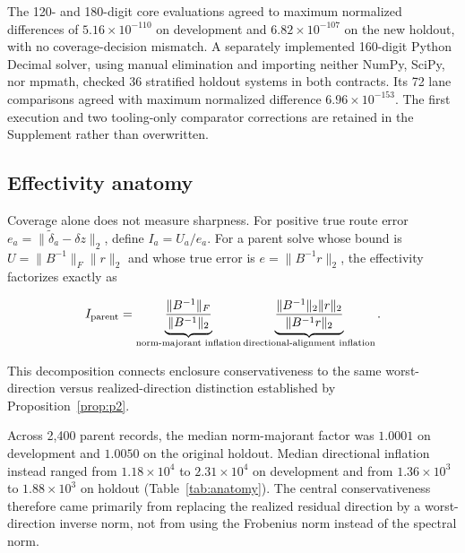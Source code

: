 The 120- and 180-digit core evaluations agreed to maximum normalized
differences of $5.16\times10^{-110}$ on development and
$6.82\times10^{-107}$ on the new holdout, with no coverage-decision
mismatch. A separately implemented 160-digit Python Decimal solver, using
manual elimination and importing neither NumPy, SciPy, nor mpmath, checked
36 stratified holdout systems in both contracts. Its 72 lane comparisons
agreed with maximum normalized difference $6.96\times10^{-153}$. The first
execution and two tooling-only comparator corrections are retained in the
Supplement rather than overwritten.

\subsection{Effectivity anatomy}

Coverage alone does not measure sharpness. For positive true route error
$e_a=\lVert\widetilde\delta_a-\delta z\rVert_2$, define
$I_a=U_a/e_a$. For a parent solve whose bound is
$U=\lVert B^{-1}\rVert_F\lVert r\rVert_2$ and whose true error is
$e=\lVert B^{-1}r\rVert_2$, the effectivity factorizes exactly as
\begin{linenomath*}
\begin{equation}
I_{\rm parent}
=\underbrace{\frac{\lVert B^{-1}\rVert_F}
{\lVert B^{-1}\rVert_2}}_{\text{norm-majorant inflation}}
\underbrace{\frac{\lVert B^{-1}\rVert_2\lVert r\rVert_2}
{\lVert B^{-1}r\rVert_2}}_{\text{directional-alignment inflation}}.
\label{eq:effectivity_factorization}
\end{equation}
\end{linenomath*}
This decomposition connects enclosure conservativeness to the same
worst-direction versus realized-direction distinction established by
Proposition~\ref{prop:p2}.

Across 2,400 parent records, the median norm-majorant factor was
$1.0001$ on development and $1.0050$ on the original holdout. Median
directional inflation instead ranged from $1.18\times10^4$ to
$2.31\times10^4$ on development and from $1.36\times10^3$ to
$1.88\times10^3$ on holdout (Table~\ref{tab:anatomy}). The central
conservativeness therefore came primarily from replacing the realized
residual direction by a worst-direction inverse norm, not from using the
Frobenius norm instead of the spectral norm.

\begin{table}[htbp]
\centering
\footnotesize
\caption{Factorization of parent-bound effectivity. Ranges span both parent systems and both reference contracts.}
\label{tab:anatomy}

\end{table}

